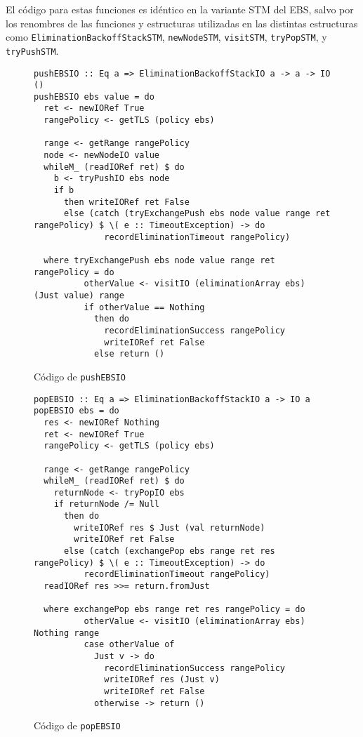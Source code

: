 El código para estas funciones es idéntico en la variante STM del EBS, salvo por los renombres de las funciones y estructuras utilizadas en las distintas estructuras como \texttt{EliminationBackoffStackSTM}, \texttt{newNodeSTM}, \texttt{visitSTM}, \texttt{tryPopSTM}, y \texttt{tryPushSTM}.
\begin{figure}[H]
  \centering
  \begin{verbatim}
pushEBSIO :: Eq a => EliminationBackoffStackIO a -> a -> IO ()
pushEBSIO ebs value = do
  ret <- newIORef True
  rangePolicy <- getTLS (policy ebs)

  range <- getRange rangePolicy
  node <- newNodeIO value
  whileM_ (readIORef ret) $ do
    b <- tryPushIO ebs node
    if b
      then writeIORef ret False
      else (catch (tryExchangePush ebs node value range ret rangePolicy) $ \( e :: TimeoutException) -> do
              recordEliminationTimeout rangePolicy)

  where tryExchangePush ebs node value range ret rangePolicy = do
          otherValue <- visitIO (eliminationArray ebs) (Just value) range
          if otherValue == Nothing
            then do
              recordEliminationSuccess rangePolicy
              writeIORef ret False
            else return ()
  \end{verbatim}
  \caption{Código de \texttt{pushEBSIO}}
  \label{pushEBSIO-code}
\end{figure}



\begin{figure}[H]
\begin{verbatim}
popEBSIO :: Eq a => EliminationBackoffStackIO a -> IO a
popEBSIO ebs = do
  res <- newIORef Nothing
  ret <- newIORef True
  rangePolicy <- getTLS (policy ebs)

  range <- getRange rangePolicy
  whileM_ (readIORef ret) $ do
    returnNode <- tryPopIO ebs
    if returnNode /= Null
      then do
        writeIORef res $ Just (val returnNode)
        writeIORef ret False
      else (catch (exchangePop ebs range ret res rangePolicy) $ \( e :: TimeoutException) -> do
          recordEliminationTimeout rangePolicy)
  readIORef res >>= return.fromJust

  where exchangePop ebs range ret res rangePolicy = do
          otherValue <- visitIO (eliminationArray ebs) Nothing range
          case otherValue of
            Just v -> do
              recordEliminationSuccess rangePolicy
              writeIORef res (Just v)
              writeIORef ret False
            otherwise -> return ()
\end{verbatim}
  \caption{Código de \texttt{popEBSIO}}
  \label{popEBSIO-code}
\end{figure}

